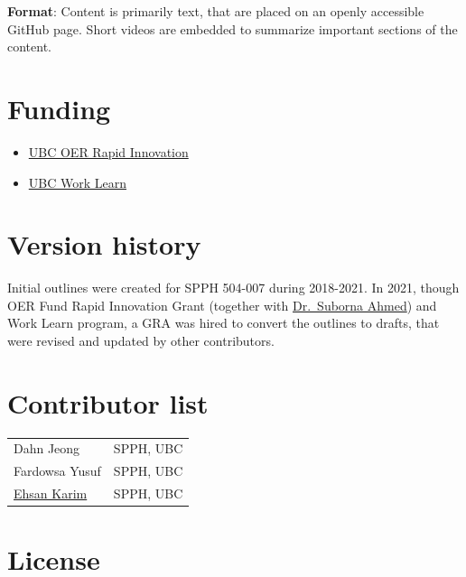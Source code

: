 \documentclass[
]{book}
\providecommand{\tightlist}{%
  \setlength{\itemsep}{0pt}\setlength{\parskip}{0pt}}
\begin{document}
\textbf{Format}: Content is primarily text, that are placed on an openly accessible GitHub page. Short videos are embedded to summarize important sections of the content.

\hypertarget{funding}{%
\section*{Funding}\label{funding}}

\begin{itemize}
\tightlist
\item
  \href{https://oerfund.open.ubc.ca/oer-rapid-innovation-grants/}{UBC OER Rapid Innovation}
\item
  \href{https://facultystaff.students.ubc.ca/student-engagement/centre-student-involvement-careers/work-learn}{UBC Work Learn}
\end{itemize}

\hypertarget{version-history}{%
\section*{Version history}\label{version-history}}

Initial outlines were created for SPPH 504-007 during 2018-2021. In 2021, though OER Fund Rapid Innovation Grant (together with \href{https://forestry.ubc.ca/faculty-profile/suborna-ahmed/}{Dr.~Suborna Ahmed}) and Work Learn program, a GRA was hired to convert the outlines to drafts, that were revised and updated by other contributors.

\hypertarget{contributor-list}{%
\section*{Contributor list}\label{contributor-list}}

\begin{longtable}[]{@{}ll@{}}
\toprule
\endhead
Dahn Jeong & SPPH, UBC \\
Fardowsa Yusuf & SPPH, UBC \\
\href{https://ehsank.com/}{Ehsan Karim} & SPPH, UBC \\
\bottomrule
\end{longtable}

\hypertarget{license}{%
\section*{License}\label{license}}
\end{document}
